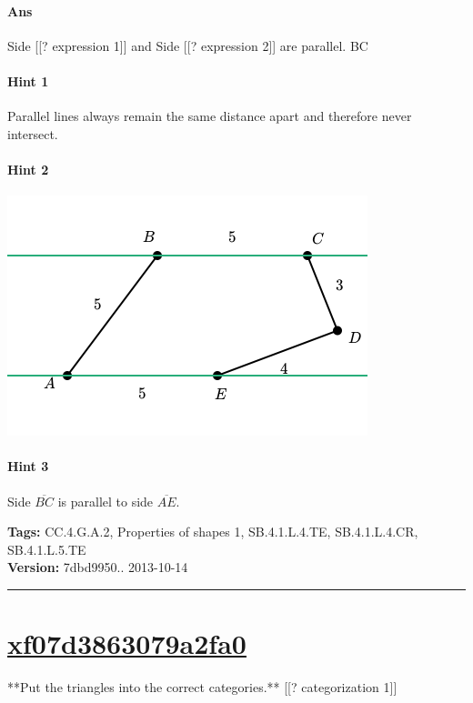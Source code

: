 \documentclass[twocolumn,10pt]{article}
\def\shrinkfactor{0.55}
\begin{document}
\paragraph{Ans} Side  [[? expression 1]] and Side  [[? expression 2]] are parallel.  BC

\paragraph{Hint 1}Parallel lines always remain the same distance apart and therefore never intersect. 

\paragraph{Hint 2}
\includegraphics[scale=\shrinkfactor]{figures/83c724a031b6ec05f29446ad771043b503b36466.png}

\paragraph{Hint 3}Side $\overline{BC}$ is parallel to side $\overline{AE}$.



\medskip
\noindent
\textbf{Tags:} {\footnotesize CC.4.G.A.2, Properties of shapes 1, SB.4.1.L.4.TE, SB.4.1.L.4.CR, SB.4.1.L.5.TE}\\
\textbf{Version:} 7dbd9950.. 2013-10-14
\smallskip\hrule





\section{\href{https://www.khanacademy.org/devadmin/content/items/xf07d3863079a2fa0}{xf07d3863079a2fa0}}

\noindent
**Put the triangles into the correct categories.**
[[? categorization 1]]
\end{document}
